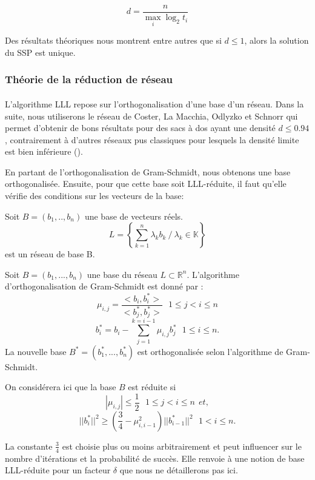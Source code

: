 $$d = \frac{n}{\max_i \log_2 t_i}$$

Des résultats théoriques nous montrent entre autres que si $d \leq 1$, alors la solution du SSP est unique.

\subsubsection{Théorie de la réduction de réseau}
\paragraph{}L'algorithme LLL repose sur l'orthogonalisation d'une base d'un réseau. Dans la suite, nous utiliserons le réseau de Coster, La Macchia, Odlyzko et Schnorr qui permet d'obtenir de bons résultats pour des sacs à dos ayant une densité $d \leq 0.94$, contrairement à d'autres réseaux pus classiques pour lesquels la densité limite est bien inférieure (\cite{DEROFF}).

En partant de l'orthogonalisation de Gram-Schmidt, nous obtenons une base orthogonalisée. Ensuite, pour que cette base soit LLL-réduite, il faut qu'elle vérifie des conditions sur les vecteurs de la base:

\begin{theo}[Réseau.]
	Soit $B=(b_1, .., b_n)$ une base de vecteurs réels. $$L = \left \{ \sum_{k=1}^{n} \lambda_k b_k \ / \ \lambda_k \in \mathbb{K} \right \} $$ est un réseau de base B.
\end{theo}

\begin{theo}
	Soit $B = (b_1, ..., b_n)$ une base du réseau $L \subset \mathbb{R}^n$. L'algorithme d'orthogonalisation de Gram-Schmidt est donné par : $$\mu_{i,j}  = \frac{<b_i, b_i^*>}{<b_j^*, b_j^*>} \  \  \ 1 \leq j < i \leq n$$ 
		$$b_i^* = b_i - \sum_{j = 1}^{k = i - 1}\mu_{i,j} b_j^*  \  \  \ 1 \leq i \leq n.$$
	La nouvelle base $B^* = (b_1^*, ..., b_n^*)$ est orthogonalisée selon l'algorithme de Gram-Schmidt.	
\end{theo}

\begin{theo} On considérera ici que la base $B$ est réduite si $$|\mu_{i,j}| \leq \frac{1}{2} \  \  \ 1 \leq j < i \leq n \ \ et, $$ 
	$$||b_i^*||^2 \ge \left ( \frac{3}{4} - \mu_{i,i-1}^2 \right )||b_{i-1}^*||^2  \  \  \ 1 < i \leq n.$$
\end{theo}

La constante $\frac{3}{4}$ est choisie plus ou moins arbitrairement et peut influencer sur le nombre d'itérations et la probabilité de succès. Elle renvoie à une notion de base LLL-réduite pour un facteur $\delta$ que nous ne détaillerons pas ici.

